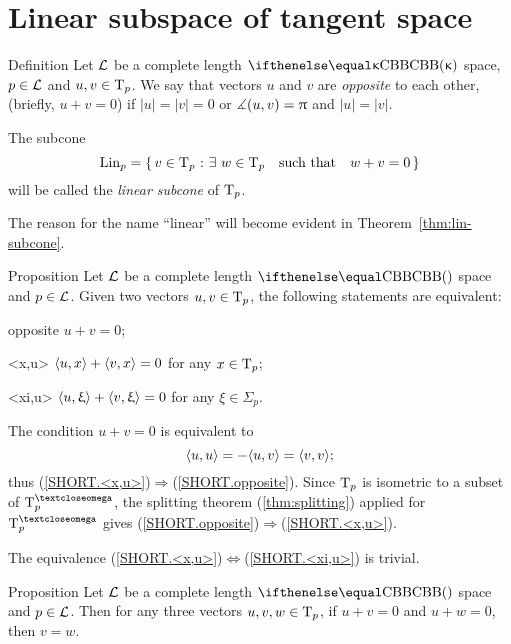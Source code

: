 \section{Linear subspace of tangent space}

\begin{thm}{Definition}\label{def:opp+Lin}
Let $\mathcal{L}$ be a complete length $\Alex{\kappa}$ space, $p\in \spc{L}$ and $u,v\in\T_p$.
We say that vectors $u$ and $v$ are \emph{opposite}\label{def:opposite:page} to each other, (briefly, $u+v=0$) if $|u|=|v|=0$ or $\measuredangle(u,v)=\uppi$ and $|u|=|v|$.

The subcone
\[\Lin_p=\set{v\in\T_p}{\exists\ w\in\T_p\quad \t{such that}\quad w+v=0}\]
will be called the \emph{linear subcone} of $\text{\rm T}_p$.
\end{thm}

The reason for the name ``linear'' will become evident in Theorem~\ref{thm:lin-subcone}.

\begin{thm}{Proposition}\label{prop:opposite}
Let $\mathcal{L}$ be a complete length $\Alex{}$ space and $p\in \spc{L}$.
Given two vectors $u,v\in\T_p$, the following statements are equivalent:
\begin{subthm}{opposite} $u+v=0$;
\end{subthm}
\begin{subthm}{<x,u>} $\langle u,x\rangle+\langle v,x\rangle=0$ for any $x\in\T_p$;
\end{subthm}
\begin{subthm}{<xi,u>} $\langle u,\upxi\rangle+\langle v,\upxi\rangle=0$ for any $\xi\in\Sigma_p$.
\end{subthm}
\end{thm}

The condition $u+v=0$ is equivalent to 
\[\langle u,u\rangle=-\langle u,v\rangle=\langle v,v\rangle;\]
thus 
(\ref{SHORT.<x,u>})$\Rightarrow$(\ref{SHORT.opposite}).
Since $\text{\rm T}_p$ is isometric to a subset of $\T^\o_p$,
the splitting theorem (\ref{thm:splitting}) applied for $\T_p^\o$
gives (\ref{SHORT.opposite})$\Rightarrow$(\ref{SHORT.<x,u>}).

The equivalence  (\ref{SHORT.<x,u>})$\Leftrightarrow$(\ref{SHORT.<xi,u>}) is trivial.
\qeds

\begin{thm}{Proposition}\label{prop:two-opp}
Let $\mathcal{L}$  be a complete length $\Alex{}$ space and $p\in \spc{L}$.
Then for any three vectors $u,v,w\in\T_p$, if $u+v=0$ and $u+ w=0$, then $v=w$.
\end{thm}

